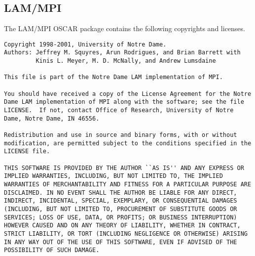 %
%
%

\subsection{LAM/MPI}
The LAM/MPI OSCAR package contains the following copyrights and
licenses.

\begin{verbatim}
Copyright 1998-2001, University of Notre Dame.
Authors: Jeffrey M. Squyres, Arun Rodrigues, and Brian Barrett with
         Kinis L. Meyer, M. D. McNally, and Andrew Lumsdaine

This file is part of the Notre Dame LAM implementation of MPI.

You should have received a copy of the License Agreement for the Notre
Dame LAM implementation of MPI along with the software; see the file
LICENSE.  If not, contact Office of Research, University of Notre
Dame, Notre Dame, IN 46556.

Redistribution and use in source and binary forms, with or without
modification, are permitted subject to the conditions specified in the
LICENSE file.

THIS SOFTWARE IS PROVIDED BY THE AUTHOR ``AS IS'' AND ANY EXPRESS OR
IMPLIED WARRANTIES, INCLUDING, BUT NOT LIMITED TO, THE IMPLIED
WARRANTIES OF MERCHANTABILITY AND FITNESS FOR A PARTICULAR PURPOSE ARE
DISCLAIMED. IN NO EVENT SHALL THE AUTHOR BE LIABLE FOR ANY DIRECT,
INDIRECT, INCIDENTAL, SPECIAL, EXEMPLARY, OR CONSEQUENTIAL DAMAGES
(INCLUDING, BUT NOT LIMITED TO, PROCUREMENT OF SUBSTITUTE GOODS OR
SERVICES; LOSS OF USE, DATA, OR PROFITS; OR BUSINESS INTERRUPTION)
HOWEVER CAUSED AND ON ANY THEORY OF LIABILITY, WHETHER IN CONTRACT,
STRICT LIABILITY, OR TORT (INCLUDING NEGLIGENCE OR OTHERWISE) ARISING
IN ANY WAY OUT OF THE USE OF THIS SOFTWARE, EVEN IF ADVISED OF THE
POSSIBILITY OF SUCH DAMAGE.
\end{verbatim}

